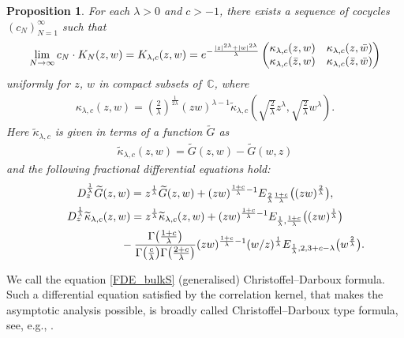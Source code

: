 \documentclass[11pt]{article}
\numberwithin{equation}{section}
\numberwithin{equation}{section}
\newtheorem{Proposition}[Theorem]{Proposition}
 { \theoremstyle{definition}
\newtheorem{Definition}[Theorem]{Definition}
\newtheorem{Example}[Theorem]{Example}
\newtheorem{Remark}[Theorem]{Remark} }
\newcommand{\C}{{\mathbb C}}
\newcommand{\1}{\chi}
\begin{document}
\begin{Proposition} \label{Thm_bulkS}
	For each $\lambda>0$ and $c>-1$, there exists a sequence of cocycles $(c_N)_{N=1}^\infty$ such that
	\begin{gather*}
			\lim_{N \to \infty} c_N\cdot K_N(z,w)=K_{\lambda,c}(z,w)
			={\rm e}^{ -\frac{ |z|^{2\lambda}+|w|^{2\lambda} }{\lambda} } \begin{pmatrix}
				\kappa_{\lambda,c}(z,w) & \kappa_{\lambda,c}(z,\bar{w}) \\
				\kappa_{\lambda,c}(\bar{z},w) & \kappa_{\lambda,c}(\bar{z},\bar{w})
			\end{pmatrix}
		\end{gather*}
	uniformly for $z$, $w$ in compact subsets of~$\C$, where
	\begin{gather*}
		\kappa_{\lambda,c}(z,w)=\left( \frac{2}{\lambda} \right)^{ \frac{1}{2\lambda} } (zw)^{\lambda-1} \widetilde{\kappa}_{\lambda,c} \left( \sqrt{ \frac{2}{\lambda} } z^\lambda, \sqrt{ \frac{2}{\lambda} } w^\lambda \right).
	\end{gather*}
	Here $\widetilde{\kappa}_{\lambda,c}$ is given in terms of a function $\widetilde{G}$ as
	\begin{gather*}
	\widetilde{\kappa}_{\lambda,c}(z,w)=\widetilde{G}(z,w)-\widetilde{G}(w,z)
	\end{gather*}
 and the following fractional differential equations hold:
	\begin{gather} \label{G zw FDE}
		D_z^{ \frac{1}{\lambda} } \widetilde{G}(z,w)= z^{ \frac{1}{\lambda} } \widetilde{G}(z,w)+(zw)^{\frac{1+c}{\lambda}-1} E_{\frac{2}{\lambda} \frac{1+c}{\lambda} } \big( (zw)^{\frac{2}{\lambda}} \big),
\\
			D_z^{ \frac{1}{\lambda} } \widetilde{\kappa}_{\lambda,c}(z,w)
			= z^{ \frac{1}{\lambda} } \widetilde{\kappa}_{\lambda,c}(z,w)+ (zw)^{ \frac{1+c}{\lambda}-1 } E_{ \frac{1}{\lambda},\frac{1+c}{\lambda} } \big( (zw)^{\frac{1}{\lambda}} \big)
			\nonumber\\
\hphantom{D_z^{ \frac{1}{\lambda} } \widetilde{\kappa}_{\lambda,c}(z,w)=}{}
 -\frac{ \Gamma\big(\frac{1+c}{\lambda}\big) }{\Gamma\big( \frac{c}{\lambda}\big) \Gamma\big( \frac{2+c}{\lambda}\big) } (zw)^{ \frac{1+c}{\lambda}-1 }(w/z)^{\frac{1}{\lambda}} E_{\frac{1}{\lambda},2,3+c-\lambda}\big(w^{\frac{2}{\lambda}}\big) .\label{FDE_bulkS}
		\end{gather}
\end{Proposition}


We call the equation \eqref{FDE_bulkS} (generalised) Christoffel--Darboux formula.
Such a differential equation satisfied by the correlation kernel, that makes the asymptotic analysis possible, is broadly called Christoffel--Darboux type formula, see, e.g., \cite{MR1917675,byun2021lemniscate,MR3450566}.
\end{document}
